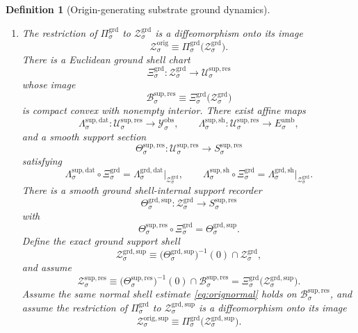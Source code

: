 \documentclass[11pt]{article}
\newcommand{\DataSpace}[1]{\mathcal Y_{#1}^{\mathrm{obs}}}
\newcommand{\AmbientTarget}[1]{E_{#1}^{\mathrm{amb}}}
\newcommand{\ResSpace}[1]{\mathcal U_{#1}^{\mathrm{sup,res}}}
\newcommand{\ResBody}[1]{\mathcal B_{#1}^{\mathrm{sup,res}}}
\newcommand{\ResTarget}[1]{S_{#1}^{\mathrm{sup,res}}}
\newcommand{\ResSection}[1]{\Theta_{#1}^{\mathrm{sup,res}}}
\newcommand{\ResData}[1]{\Lambda_{#1}^{\mathrm{sup,dat}}}
\newcommand{\ResShellMap}[1]{\Lambda_{#1}^{\mathrm{sup,sh}}}
\newcommand{\ResShellSet}[1]{\mathcal Z_{#1}^{\mathrm{sup,res}}}
\newcommand{\OrigShellSet}[1]{\mathcal Z_{#1}^{\mathrm{orig}}}
\newcommand{\OrigSupportShell}[1]{\mathcal Z_{#1}^{\mathrm{orig,sup}}}
\newcommand{\GroundProj}[1]{\Pi_{#1}^{\mathrm{grd}}}
\newcommand{\GroundData}[1]{\Lambda_{#1}^{\mathrm{grd,dat}}}
\newcommand{\GroundShellMap}[1]{\Lambda_{#1}^{\mathrm{grd,sh}}}
\newcommand{\GroundShellSet}[1]{\mathcal Z_{#1}^{\mathrm{grd}}}
\newcommand{\GroundChart}[1]{\Xi_{#1}^{\mathrm{grd}}}
\newcommand{\GroundSupport}[1]{\Theta_{#1}^{\mathrm{grd,sup}}}
\newcommand{\GroundSupportShell}[1]{\mathcal Z_{#1}^{\mathrm{grd,sup}}}
\newtheorem{definition}{Definition}
\begin{document}
\begin{definition}[Origin-generating substrate ground dynamics]
\begin{enumerate}
    \item The restriction of \(\GroundProj{\sigma}\) to \(\GroundShellSet{\sigma}\) is a diffeomorphism onto its image
    \[
    \OrigShellSet{\sigma}
    \equiv
    \GroundProj{\sigma}\bigl(\GroundShellSet{\sigma}\bigr).
    \]
    There is a Euclidean ground shell chart
    \[
    \GroundChart{\sigma}:\GroundShellSet{\sigma}\to\ResSpace{\sigma}
    \]
    whose image
    \[
    \ResBody{\sigma}
    \equiv
    \GroundChart{\sigma}\bigl(\GroundShellSet{\sigma}\bigr)
    \]
    is compact convex with nonempty interior. There exist affine maps
    \[
    \ResData{\sigma}:\ResSpace{\sigma}\to\DataSpace{\sigma},
    \qquad
    \ResShellMap{\sigma}:\ResSpace{\sigma}\to\AmbientTarget{\sigma},
    \]
    and a smooth support section
    \[
    \ResSection{\sigma}:\ResSpace{\sigma}\to\ResTarget{\sigma}
    \]
    satisfying
    \begin{equation}
    \ResData{\sigma}\circ\GroundChart{\sigma}
    =
    \GroundData{\sigma}\big|_{\GroundShellSet{\sigma}},
    \qquad
    \ResShellMap{\sigma}\circ\GroundChart{\sigma}
    =
    \GroundShellMap{\sigma}\big|_{\GroundShellSet{\sigma}}.
    \label{eq:groundchartreadouts}
    \end{equation}
    There is a smooth ground shell-internal support recorder
    \[
    \GroundSupport{\sigma}:\GroundShellSet{\sigma}\to\ResTarget{\sigma}
    \]
    with
    \begin{equation}
    \ResSection{\sigma}\circ\GroundChart{\sigma}
    =
    \GroundSupport{\sigma}.
    \label{eq:groundsupporttransport}
    \end{equation}
    Define the exact ground support shell
    \begin{equation}
    \GroundSupportShell{\sigma}
    \equiv
    \bigl(\GroundSupport{\sigma}\bigr)^{-1}(0)\cap\GroundShellSet{\sigma},
    \label{eq:groundsupportshell}
    \end{equation}
    and assume
    \begin{equation}
    \ResShellSet{\sigma}
    \equiv
    \bigl(\ResSection{\sigma}\bigr)^{-1}(0)\cap\ResBody{\sigma}
    =
    \GroundChart{\sigma}\bigl(\GroundSupportShell{\sigma}\bigr).
    \label{eq:groundtransportedsupportshell}
    \end{equation}
    Assume the same normal shell estimate \eqref{eq:orignormal} holds on \(\ResBody{\sigma}\), and assume the restriction of \(\GroundProj{\sigma}\) to \(\GroundSupportShell{\sigma}\) is a diffeomorphism onto its image
    \[
    \OrigSupportShell{\sigma}
    \equiv
    \GroundProj{\sigma}\bigl(\GroundSupportShell{\sigma}\bigr).
    \]


\end{enumerate}
\end{definition}
\end{document}

